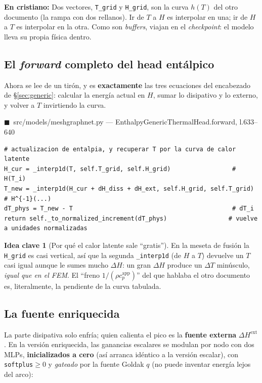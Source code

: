\documentclass[11pt]{article}
\newcommand{\cpapp}{c_p^{\mathrm{app}}}
\theoremstyle{definition}
\newtheorem{idea}{Idea clave}[section]
\theoremstyle{plain}
\newcommand{\dummies}[1]{%
  \par\smallskip\noindent
  \colorbox{yellow!18}{\parbox{\dimexpr\linewidth-2\fboxsep}{%
  \small\textbf{En cristiano:} #1}}\par\smallskip}
\newcommand{\srcref}[1]{\par\smallskip\noindent
  {\footnotesize\ttfamily\textcolor{srcblue}{$\blacksquare$\ #1}}\par\vspace{1pt}}
\begin{document}
\dummies{Dos vectores, \texttt{T\_grid} y \texttt{H\_grid}, son la curva $h(T)$ del
otro documento (la rampa con dos rellanos). Ir de $T$ a $H$ es interpolar en una;
ir de $H$ a $T$ es interpolar en la otra. Como son \emph{buffers}, viajan en el
\emph{checkpoint}: el modelo lleva su propia física dentro.}

\subsection{El \emph{forward} completo del head entálpico}

Ahora se lee de un tirón, y es \textbf{exactamente} las tres ecuaciones del
encabezado de §\ref{sec:generic}: calcular la energía actual en $H$, sumar lo
disipativo y lo externo, y volver a $T$ invirtiendo la curva.

\srcref{src/models/meshgraphnet.py — EnthalpyGenericThermalHead.forward, l.633--640}
\begin{lstlisting}
# actualizacion de entalpia, y recuperar T por la curva de calor latente
H_cur = _interp1d(T, self.T_grid, self.H_grid)                 # H(T_i)
T_new = _interp1d(H_cur + dH_diss + dH_ext, self.H_grid, self.T_grid)  # H^{-1}(...)
dT_phys = T_new - T                                            # dT_i
return self._to_normalized_increment(dT_phys)                 # vuelve a unidades normalizadas
\end{lstlisting}

\begin{idea}[Por qué el calor latente sale ``gratis'']
En la meseta de fusión la \texttt{H\_grid} es casi vertical, así que la segunda
\texttt{\_interp1d} (de $H$ a $T$) devuelve un $T$ casi igual aunque le sumes mucho
$\Delta H$: un gran $\Delta H$ produce un $\Delta T$ minúsculo, \emph{igual que en el
FEM}. El ``freno $1/(\rho\cpapp)$'' del que hablaba el otro documento es,
literalmente, la pendiente de la curva tabulada.
\end{idea}

\subsection{La fuente enriquecida}

La parte disipativa solo enfría; quien calienta el pico es la \textbf{fuente
externa} $\Delta H^{\mathrm{ext}}$. En la versión enriquecida, las ganancias
escalares se modulan por nodo con dos MLPs, \textbf{inicializados a cero} (así
arranca idéntico a la versión escalar), con \texttt{softplus}$\ge0$ y
\emph{gateado} por la fuente Goldak $q$ (no puede inventar energía lejos del arco):
\end{document}
